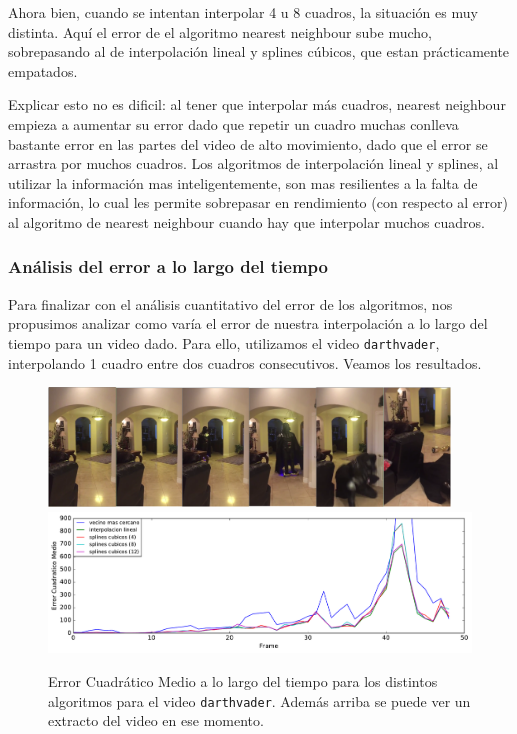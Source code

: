 Ahora bien, cuando se intentan interpolar 4 u 8 cuadros, la situación es muy distinta. Aquí el error de el algoritmo nearest neighbour sube mucho, sobrepasando al de interpolación lineal y splines cúbicos, que estan prácticamente empatados.

Explicar esto no es dificil: al tener que interpolar más cuadros, nearest neighbour empieza a aumentar su error dado que repetir un cuadro muchas conlleva bastante error en las partes del video de alto movimiento, dado que el error se arrastra por muchos cuadros. Los algoritmos de interpolación lineal y splines, al utilizar la información mas inteligentemente, son mas resilientes a la falta de información, lo cual les permite sobrepasar en rendimiento (con respecto al error) al
algoritmo de nearest neighbour cuando hay que interpolar muchos cuadros.

\subsubsection{Análisis del error a lo largo del tiempo}

Para finalizar con el análisis cuantitativo del error de los algoritmos, nos propusimos analizar como varía el error de nuestra interpolación a lo largo del tiempo para un video dado. Para ello, utilizamos el video \texttt{darthvader}, interpolando 1 cuadro entre dos cuadros consecutivos. Veamos los resultados.

\begin{figure}[H]
    \centering
    \includegraphics[width=0.95\textwidth]{imgs/resultados_error/recorrido.png}
    \includegraphics[width=1\textwidth]{imgs/resultados_error/temporal.pdf}
    \caption{Error Cuadrático Medio a lo largo del tiempo para los distintos algoritmos para el video \texttt{darthvader}. Además arriba se puede ver un extracto del video en ese momento.}
    \label{fig:errtiempo}
\end{figure}

